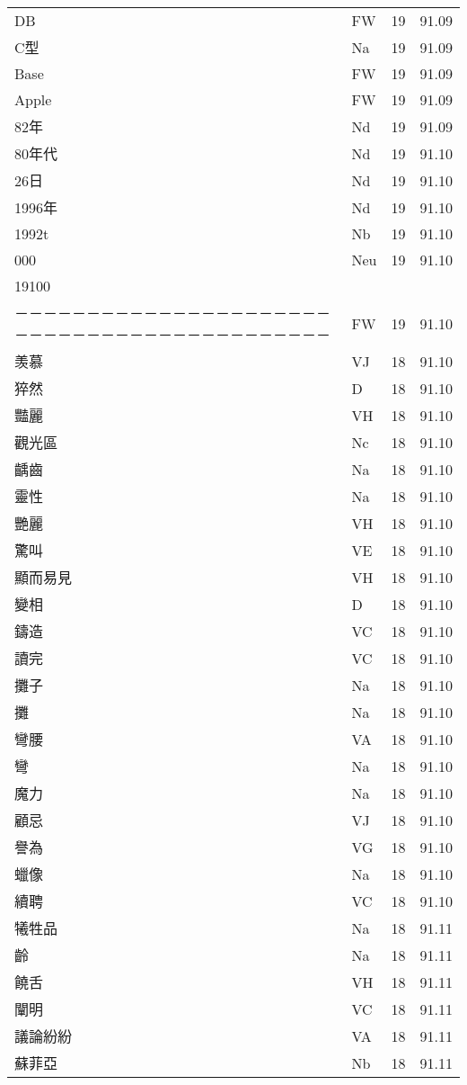 \documentclass[twocolumn]{book}
\begin{document}
\begin{supertabular}{llrr}
DB & FW & 19 &  91.09\\
C型 & Na & 19 &  91.09\\
Base & FW & 19 &  91.09\\
Apple & FW & 19 &  91.09\\
82年 & Nd & 19 &  91.09\\
80年代 & Nd & 19 &  91.10\\
26日 & Nd & 19 &  91.10\\
1996年 & Nd & 19 &  91.10\\
1992t & Nb & 19 &  91.10\\
000 & Neu & 19 &  91.10\\
19100\\
－－－－－－－－－－－－－－－－－－－－－－－－－－－－－－－－－－－－－－－－－－－－ & FW & 19 &  91.10\\
羡慕 & VJ & 18 &  91.10\\
猝然 & D & 18 &  91.10\\
豔麗 & VH & 18 &  91.10\\
觀光區 & Nc & 18 &  91.10\\
齲齒 & Na & 18 &  91.10\\
靈性 & Na & 18 &  91.10\\
艷麗 & VH & 18 &  91.10\\
驚叫 & VE & 18 &  91.10\\
顯而易見 & VH & 18 &  91.10\\
變相 & D & 18 &  91.10\\
鑄造 & VC & 18 &  91.10\\
讀完 & VC & 18 &  91.10\\
攤子 & Na & 18 &  91.10\\
攤 & Na & 18 &  91.10\\
彎腰 & VA & 18 &  91.10\\
彎 & Na & 18 &  91.10\\
魔力 & Na & 18 &  91.10\\
顧忌 & VJ & 18 &  91.10\\
譽為 & VG & 18 &  91.10\\
蠟像 & Na & 18 &  91.10\\
續聘 & VC & 18 &  91.10\\
犧牲品 & Na & 18 &  91.11\\
齡 & Na & 18 &  91.11\\
饒舌 & VH & 18 &  91.11\\
闡明 & VC & 18 &  91.11\\
議論紛紛 & VA & 18 &  91.11\\
蘇菲亞 & Nb & 18 &  91.11\\

\end{supertabular}
\end{document}
